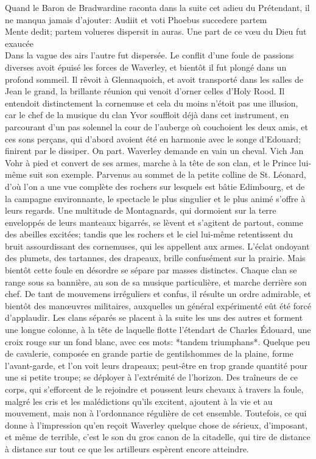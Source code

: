 Quand le Baron de Bradwardine raconta dans la suite cet adieu du Prétendant, il ne manqua jamais d'ajouter:
\small{Audiit et voti Phoebus succedere partem\\Mente dedit; partem volueres dispersit in auras.}
\small{Une part de ce vœu du Dieu fut exaucée\\Dans la vague des airs l'autre fut dispersée.}
Le conflit d'une foule de passions diverses avoit épuisé les forces de Waverley, et bientôt il fut plongé dans un profond sommeil. Il rêvoit à Glennaquoich, et avoit transporté dans les salles de Jean le grand, la brillante réunion qui venoit d'orner celles d'Holy Rood. Il entendoit distinctement la cornemuse et cela du moins n'étoit pas une illusion, car le chef de la musique du clan Yvor souffloit déjà dans cet instrument, en parcourant d'un pas solennel la cour de l'auberge où couchoient les deux amis, et ces sons perçans, qui d'abord avoient été en\setcounter{page}{232} harmonie avec le songe d'Edouard; finirent par le dissiper. On part. Waverley demande en vain un cheval. Vich Jan Vohr à pied et convert de ses armes, marche à la tête de son clan, et le Prince lui-même suit son exemple. Parvenus au sommet de la petite colline de St. Léonard, d'où l'on a une vue complète des rochers sur lesquels est bâtie Edimbourg, et de la campagne environnante, le spectacle le plus singulier et le plus animé s'offre à leurs regards. Une multitude de Montagnards, qui dormoient sur la terre enveloppés de leurs manteaux bigarrés, se lèvent et s'agitent de partout, comme des abeilles excitées; tandis que les rochers et le ciel lui-même retentissent du bruit assourdissant des cornemuses, qui les appellent aux armes. L'éclat ondoyant des plumets, des tartannes, des drapeaux, brille confusément sur la prairie. Mais bientôt cette foule en désordre se sépare par masses distinctes. Chaque clan se range sous sa bannière, au son de sa musique particulière, et marche derrière son chef. De tant de mouvemens irréguliers et confus, il résulte un ordre admirable, et bientôt des manœuvres militaires, auxquelles un général expérimenté eût été forcé d'applaudir.\setcounter{page}{233} Les clans séparés se placent à la suite les uns des autres et forment une longue colonne, à la tête de laquelle flotte l'étendart de Charles Édouard, une croix rouge sur un fond blanc, avec ces mots: *tandem triumphans*. Quelque peu de cavalerie, composée en grande partie de gentilshommes de la plaine, forme l'avant-garde, et l'on voit leurs drapeaux; peut-être en trop grande quantité pour une si petite troupe; se déployer à l'extrémité de l'horizon. Des traîneurs de ce corps, qui s'efforcent de le rejoindre et poussent leurs chevaux à travers la foule, malgré les cris et les malédictions qu'ils excitent, ajoutent à la vie et au mouvement, mais non à l'ordonnance régulière de cet ensemble. Toutefois, ce qui donne à l'impression qu'en reçoit Waverley quelque chose de sérieux, d'imposant, et même de terrible, c'est le son du gros canon de la citadelle, qui tire de distance à distance sur tout ce que les artilleurs espèrent encore atteindre.
